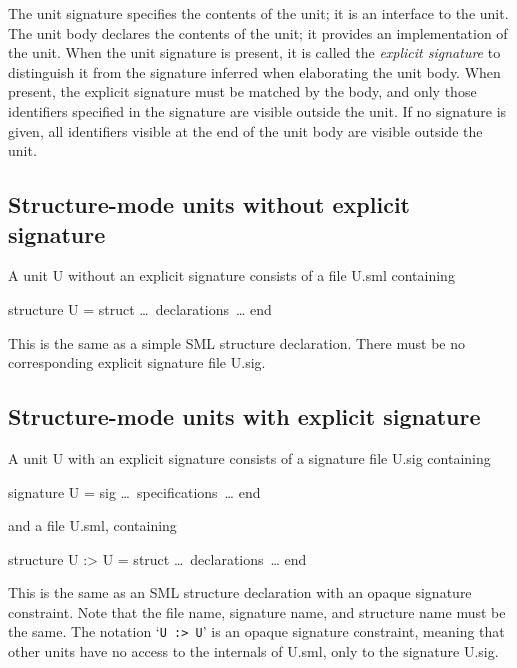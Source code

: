 \documentclass[fleqn]{article}
\begin{document}
The unit signature specifies the
contents of the unit; it is an interface to the unit.  The unit body
declares the contents of the unit; it provides an implementation of
the unit.  When the unit signature is present, it is called the {\em
  explicit signature\/} to distinguish it from the signature inferred
when elaborating the unit body.  When present, the explicit signature
must be matched by the body, and only those identifiers specified in
the signature are visible outside the unit.  If no signature is given,
all identifiers visible at the end of the unit body are visible
outside the unit.


\subsection{Structure-mode units without explicit signature}
\label{sec-units-without}

A unit U without an explicit signature consists of a file U.sml
containing 

\begin{program}
structure U = struct {\rm \ldots\ declarations\ \ldots} end
\end{program}

\noindent This is the same as a simple SML structure declaration.
There must be no corresponding explicit signature file U.sig.


\subsection{Structure-mode units with explicit signature}
\label{sec-units-with}

A unit U with an explicit signature consists of a signature file
U.sig containing

\begin{program}
signature U = sig {\rm \ldots\ specifications\ \ldots} end
\end{program}

\noindent and a file U.sml, containing

\begin{program}
structure U :> U = struct {\rm \ldots\ declarations\ \ldots} end
\end{program}

\noindent This is the same as an SML structure declaration with an
opaque signature constraint.  Note that the file name, signature name,
and structure name must be the same.  The notation `{\tt U :> U}' is
an opaque signature constraint, meaning that other units have no
access to the internals of U.sml, only to the signature U.sig.
\end{document}
